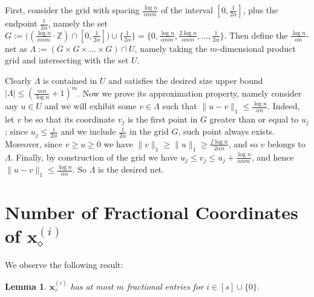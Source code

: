 \documentclass{article}
\newcommand{\red}[1]{{\color{red} #1}}
\newcommand{\xv}[0]{\mathbf{x}}
\newtheorem{lem}[thm]{Lemma}
\begin{document}
First, consider the grid with spacing $\frac{\log n}{\alpha n m}$ of the interval $[0,\frac{1}{2\alpha}]$, plus the endpoint $\frac{1}{2\alpha}$, namely the set $G := \big((\frac{\log n}{\alpha n m} \cdot \mathbb{Z}) \cap [0,\frac{1}{2\alpha}]\big) \cup \{\frac{1}{2\alpha}\} = \{0, \frac{\log n}{\alpha n m}, \frac{2\log n}{\alpha n m}, \ldots, \frac{1}{2\alpha}\}$. Then define the $\frac{\log n}{\alpha n}$-net as $\Lambda := (G \times G \times \ldots \times G) \cap U$, namely taking the $m$-dimensional product grid and intersecting with the set $U$. 

Clearly $\Lambda$ is contained in $U$ and satisfies the desired size upper bound $|\Lambda| \le (\frac{mn}{\log n} + 1)^m$. Now we prove its approximation property, namely consider any $u \in U$ and we will exhibit some $v \in \Lambda$ such that $\|u-v\|_1 \le \frac{\log n}{\alpha n}$. Indeed, let $v$ be so that its coordinate $v_j$ is the first point in $G$ greater than or equal to $u_j$; since $u_j \le \frac{1}{2\alpha}$ and we include $\frac{1}{2\alpha}$ in the grid $G$, such point always exists. Moreover, since $v \ge u \ge 0$ we have $\|v\|_1 \ge \|u\|_1 \ge \frac{f \log n}{2\alpha n}$, and so $v$ belongs to $\Lambda$. Finally, by construction of the grid we have $u_j \le v_j \le u_j + \frac{\log n}{\alpha n m}$, and hence $\|u-v\|_1 \le \frac{\log n}{\alpha n}$. So $\Lambda$ is the desired net. 









\section{Number of Fractional Coordinates of $\xv^{(i)}_\diamond$} \label{app:fractional}


We observe the following result:
\begin{lem}
    $\xv^{(i)}_\diamond$ has at most $m$ fractional entries for $i \in [s] \cup \{0\}$.
\end{lem}
\end{document}
